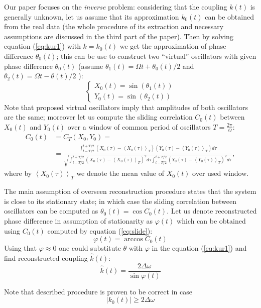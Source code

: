 \documentclass{ws-ijbc}
\begin{document}
Our paper focuses on the \emph{inverse} problem: considering that
the coupling $k(t)$ is generally unknown, let us assume that its
approximation $k_{0}(t)$ can be obtained from the real data (the
whole procedure of its extraction and necessary assumptions are discussed
in the third part of the paper). Then by solving equation (\ref{eq:kur1})
with $k=k_{0}(t)$ we get the approximation of phase difference $\theta_{0}(t)$;
this can be use to construct two ``virtual'' oscillators with given
phase difference $\theta_{0}(t)$ (assume $\theta_{1}(t)=\Omega t+\theta_{0}(t)/2$
and $\theta_{2}(t)=\Omega t-\theta(t)/2$ ):
\[
\begin{cases}
X_{0}(t)=\sin\left(\theta_{1}(t)\right)\\
Y_{0}(t)=\sin\left(\theta_{2}(t)\right)
\end{cases}
\]
Note that proposed virtual oscillators imply that amplitudes of both
oscillators are the same; moreover let us compute the sliding correlation
$C_{0}(t)$ between $X_{0}(t)$ and $Y_{0}(t)$ over a window of common
period of oscillators $T=\frac{2\pi}{\Omega}$:
\begin{align}
C_{0}(t) & =C_{T}(X_{0},Y_{0})=\label{eq:slide}\\
 & =\frac{\int_{t-T/2}^{t+T/2}\left(X_{0}(\tau)-\left\langle X_{0}(\tau)\right\rangle _{T}\right)\left(Y_{0}(\tau)-\left\langle Y_{0}(\tau)\right\rangle _{T}\right)d\tau}{\sqrt{\int_{t-T/2}^{t+T/2}\left(X_{0}(\tau)-\left\langle X_{0}(\tau)\right\rangle _{T}\right)^{2}d\tau\int_{t-T/2}^{t+T/2}\left(Y_{0}(\tau)-\left\langle Y_{0}(\tau)\right\rangle _{T}\right)^{2}d\tau}},\nonumber 
\end{align}
where by $\left\langle X_{0}(\tau)\right\rangle _{T}$ we denote the
mean value of $X_{0}(t)$ over used window.

The main assumption of overseen reconstruction procedure states that
the system is close to its stationary state; in which case the sliding
correlation between oscillators can be computed as $\theta_{0}(t)=\cos C_{0}(t)$.
Let us denote reconstructed phase difference in assumption of stationarity as $\varphi(t)$ which can be
obtained using $C_{0}(t)$ computed by equation (\ref{eq:slide}):
\[
\varphi(t)=\arccos C_{0}(t)
\]
Using that $\dot{\varphi}\approx0$ one could substitute $\theta$
with $\varphi$ in the equation (\ref{eq:kur1}) and find reconstructed
coupling $\hat{k}(t)$:
\[
\hat{k}(t)=\frac{2\Delta\omega}{\sin\varphi(t)}
\]

Note that described procedure is proven to be correct in case
\begin{equation}
\left|k_{0}(t)\right|\ge2\Delta\omega\label{eq:ineq}
\end{equation}
\end{document}
